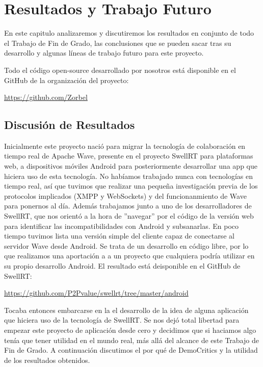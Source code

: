 \newpage
\thispagestyle{sectioned}
\chapter{Resultados y Trabajo Futuro}

En este capitulo analizaremos y discutiremos los resultados en conjunto de todo el Trabajo de Fin de Grado, las conclusiones que se pueden sacar tras su desarrollo y algunas líneas de trabajo futuro para este proyecto.

Todo el código open-source desarrollado por nosotros está disponible en el GitHub de la organización del proyecto:

\url{https://github.com/Zorbel}

\section{Discusión de Resultados}

Inicialmente este proyecto nació para migrar la tecnología de colaboración en tiempo real de Apache Wave, presente en el proyecto SwellRT para plataformas web, a dispositivos móviles Android para posteriormente desarrollar una app que hiciera uso de esta tecnología. No habíamos trabajado nunca con tecnologías en tiempo real, así que tuvimos que realizar una pequeña investigación previa de los protocolos implicados (XMPP y WebSockets) y del funcionanmiento de Wave para ponernos al día. Además trabajamos junto a uno de los desarrolladores de SwellRT, que nos orientó a la hora de ''navegar'' por el código de la versión web para identificar las incompatibilidades con Android y subsanarlas. En poco tiempo tuvimos lista una versión simple del cliente capaz de conectarse al servidor Wave desde Android. Se trata de un desarrollo en código libre, por lo que realizamos una aportación a a un proyecto que cualquiera podría utilizar en su propio desarrollo Android. El resultado está deisponible en el GitHub de SwellRT:

\url{https://github.com/P2Pvalue/swellrt/tree/master/android}

Tocaba entonces embarcarse en la el desarrollo de la idea de alguna aplicación que hiciera uso de la tecnología de SwellRT. Se nos dejó total libertad para empezar este proyecto de aplicación desde cero y decidimos que si haciamos algo tenía que tener utilidad en el mundo real, más allá del alcance de este Trabajo de Fin de Grado. A continuación discutimos el por qué de DemoCritics y la utilidad de los resultados obtenidos. 


